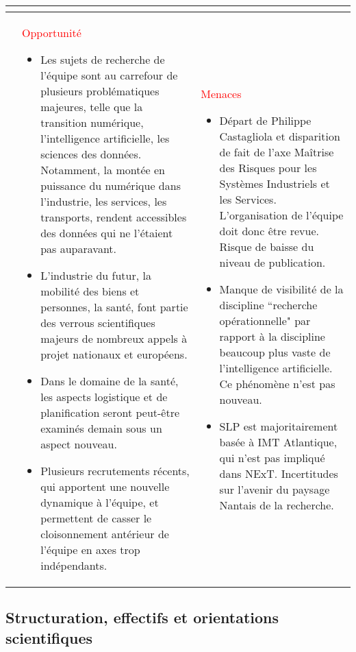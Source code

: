\begin{table}[H]
\begin{tabularx}{\textwidth}{|>{\centering\arraybackslash}l|>{\centering\arraybackslash}X|>{\centering\arraybackslash}X|}
\begin{itemize}
			\end{itemize}\\
			\hline
			\centering\color{red}\parbox[t]{2mm}{} & \centering\textcolor{red}{Opportunité} 
			\smallskip
			\begin{itemize} 
			\item  Les sujets de recherche de l'équipe sont au carrefour de plusieurs problématiques majeures, telle que la transition numérique, l'intelligence artificielle, les sciences des données. Notamment, la montée en puissance du numérique dans l'industrie, les services, les transports, rendent accessibles des données qui ne l'étaient pas auparavant. 
			\item L'industrie du futur, la mobilité des biens et personnes, la santé, font partie des verrous scientifiques majeurs de nombreux  appels à projet nationaux et européens.
			\item Dans le domaine de la santé, les aspects logistique et de planification seront peut-être examinés demain sous un aspect nouveau.
			\item  Plusieurs recrutements récents, qui apportent une nouvelle dynamique à l'équipe, et permettent de casser le cloisonnement antérieur de l'équipe en axes trop indépendants.
			\end{itemize} & \textcolor{red}{Menaces}
			\smallskip
			\begin{itemize} 
			\item  Départ de Philippe Castagliola et disparition de fait de l'axe Maîtrise des Risques pour les Systèmes Industriels et les Services. L'organisation de l'équipe doit donc être revue. Risque de baisse du niveau de publication. 
			\item Manque de visibilité de la discipline ``recherche opérationnelle" par rapport à la discipline beaucoup plus vaste de l'intelligence artificielle. Ce phénomène n'est pas nouveau. 
			\item  SLP est majoritairement basée à IMT Atlantique, qui n'est pas impliqué dans NExT. 
			Incertitudes sur l'avenir du paysage Nantais de la recherche. 
			\end{itemize}\\
			\hline
			\end{tabularx}
			\end{table}
		 

		\subsection{Structuration, effectifs et orientations scientifiques}
		
